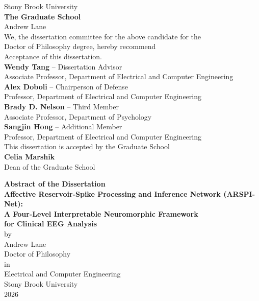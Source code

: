 \documentclass[12pt]{report}
\begin{document}
\clearpage
{}
\setcounter{page}{2}
\thispagestyle{plain}
\begin{center}
{\large Stony Brook University}\\[0.15cm]
{\large \textbf{The Graduate School}}\\[1.1cm]
{\large Andrew Lane}\\[0.7cm]

We, the dissertation committee for the above candidate for the\\
Doctor of Philosophy degree, hereby recommend\\
Acceptance of this dissertation.\\[0.9cm]

{\large \textbf{Wendy Tang} -- Dissertation Advisor}\\
Associate Professor, Department of Electrical and Computer Engineering\\[0.65cm]

{\large \textbf{Alex Doboli} -- Chairperson of Defense}\\
Professor, Department of Electrical and Computer Engineering\\[0.65cm]

{\large \textbf{Brady D. Nelson} -- Third Member}\\
Associate Professor, Department of Psychology\\[0.65cm]

{\large \textbf{Sangjin Hong} -- Additional Member}\\
Professor, Department of Electrical and Computer Engineering\\[1.0cm]

This dissertation is accepted by the Graduate School\\[0.55cm]

{\large \textbf{Celia Marshik}}\\
Dean of the Graduate School
\end{center}

\clearpage
\begin{center}
{\large \textbf{Abstract of the Dissertation}}\\[0.6cm]
{\large \textbf{Affective Reservoir-Spike Processing and Inference Network (ARSPI-Net):}}\\[0.2cm]
{\large \textbf{A Four-Level Interpretable Neuromorphic Framework}}\\[0.2cm]
{\large \textbf{for Clinical EEG Analysis}}\\[0.6cm]
{\large by}\\[0.2cm]
{\large Andrew Lane}\\[0.4cm]
{\large Doctor of Philosophy}\\[0.1cm]
{\large in}\\[0.1cm]
{\large Electrical and Computer Engineering}\\[0.1cm]
{\large Stony Brook University}\\[0.1cm]
{\large 2026}
\end{center}
\end{document}
